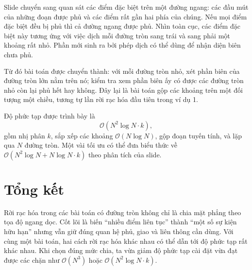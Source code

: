 \documentclass[11pt]{article}
\newcommand{\Oh}{\mathcal{O}}
\begin{document}
Slide chuyển sang quan sát các điểm đặc biệt trên một đường ngang: các đầu mút
của những đoạn được phủ và các điểm rất gần hai phía của chúng. Nếu mọi điểm
đặc biệt đều bị phủ thì cả đường ngang được phủ. Nhìn toàn cục, các điểm đặc
biệt này tương ứng với việc dịch mỗi đường tròn sang trái và sang phải một
khoảng rất nhỏ. Phần mới sinh ra bởi phép dịch có thể dùng để nhận diện biên
chưa phủ.

Từ đó bài toán được chuyển thành: với mỗi đường tròn nhỏ, xét phần biên của
đường tròn lớn nằm trên nó; kiểm tra xem phần biên ấy có được các đường tròn
nhỏ còn lại phủ hết hay không. Đây lại là bài toán gộp các khoảng trên một
đối tượng một chiều, tương tự lần rời rạc hóa đầu tiên trong ví dụ 1.

Độ phức tạp được trình bày là
\[
  \Oh(N^2\log N\cdot k),
\]
gồm nhị phân \(k\), sắp xếp các khoảng \(\Oh(N\log N)\), gộp đoạn tuyến tính,
và lặp qua \(N\) đường tròn. Một vài tối ưu có thể đưa biểu thức về
\(\Oh(N^2\log N+N\log N\cdot k)\) theo phân tích của slide.

\section{Tổng kết}

Rời rạc hóa trong các bài toán có đường tròn không chỉ là chia mặt phẳng theo
tọa độ ngang dọc. Cốt lõi là biến ``nhiều điểm liên tục'' thành ``một số sự
kiện hữu hạn'' nhưng vẫn giữ đúng quan hệ phủ, giao và liên thông cần dùng.
Với cùng một bài toán, hai cách rời rạc hóa khác nhau có thể dẫn tới độ phức
tạp rất khác nhau. Khi chọn đúng mức chia, ta vừa giảm độ phức tạp cài đặt vừa
đạt được các chặn như \(\Oh(N^3)\) hoặc \(\Oh(N^2\log N\cdot k)\).
\end{document}
